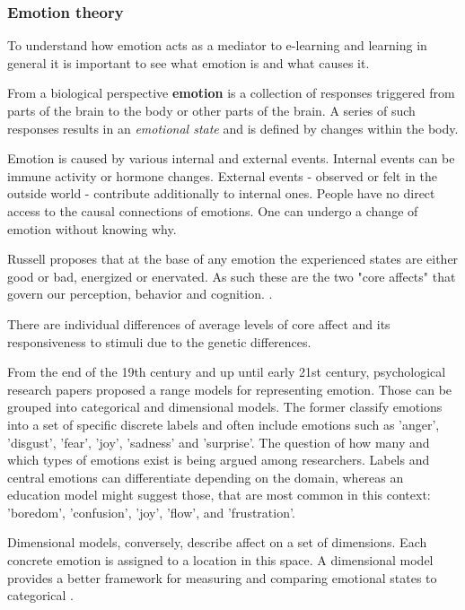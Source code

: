 		\subsubsection{Emotion theory} \label{sec:emotion-theory}
		
		To understand how emotion acts as a mediator to e-learning and learning in general it is important to see what emotion is and what causes it.
		
		From a biological perspective \textbf{emotion} is a collection of responses triggered from parts of the brain to the body or other parts of the brain. A series of such responses results in an \textit{emotional state} and is defined by changes within the body. \cite{Damasio1998}
	
		Emotion is caused by various internal and external events. Internal events can be immune activity or hormone changes. External events - observed or felt in the outside world - contribute additionally to internal ones. People have no direct access to the causal connections of emotions. One can undergo a change of emotion without knowing why. \cite{Russell2003}
		
		Russell proposes that at the base of any emotion the experienced states are either good or bad, energized or enervated. As such these are the two "core affects" that govern our perception, behavior and cognition. \cite{Russell2003}. 
		
		There are individual differences of average levels of core affect and its responsiveness to stimuli due to the genetic differences. \cite{Russell2003}
		
		From the end of the 19th century and up until early 21st century, psychological research papers proposed a range models for representing emotion. Those can be grouped into categorical and dimensional models. The former classify emotions into a set of specific discrete labels and often include emotions such as 'anger', 'disgust', 'fear', 'joy', 'sadness' and 'surprise'. The question of how many and which types of emotions exist is being argued among researchers. 
		Labels and central emotions can differentiate depending on the domain, whereas an education model might suggest those, that are most common in this context: 'boredom', 'confusion', 'joy', 'flow', and 'frustration'.
		
		Dimensional models, conversely, describe affect on a set of dimensions. Each concrete emotion is assigned to a location in this space. A dimensional model provides a better framework for measuring and comparing emotional states to categorical \cite{SreejaPSMahalakshmi2017, Harley2016}.
		
